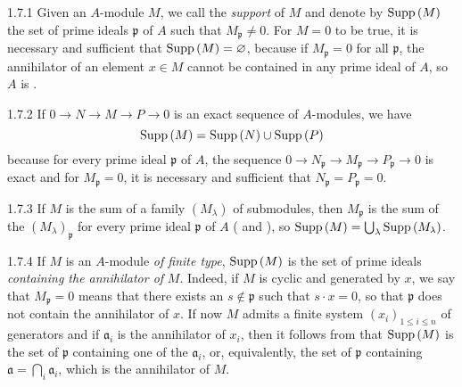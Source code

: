 \begin{env}{1.7.1}
\label{env-0.1.7.1}
Given an $A$-module $M$, we call the \emph{support} of $M$ and denote by
${\mathop{\mathrm{Supp}}\nolimits}\,(M)$ the set of prime ideals $\mathfrak{p}$ of $A$ such that
$M_\mathfrak{p}\neq 0$. For $M=0$ to be true, it is necessary and sufficient
that ${\mathop{\mathrm{Supp}}\nolimits}\,(M)=\varnothing$, because if $M_\mathfrak{p}=0$ for all $\mathfrak{p}$, the
annihilator of an element $x\in M$ cannot be contained in any prime ideal of
$A$, so $A$ is .
\end{env}

\begin{env}{1.7.2}
\label{env-0.1.7.2}
If $0\to N\to M\to P\to 0$ is an exact sequence of $A$-modules, we have
\[
  {\mathop{\mathrm{Supp}}\nolimits}\,(M)={\mathop{\mathrm{Supp}}\nolimits}\,(N)\cup{\mathop{\mathrm{Supp}}\nolimits}\,(P)
\]
because for every prime ideal $\mathfrak{p}$ of $A$, the sequence
$0\to N_\mathfrak{p}\to M_\mathfrak{p}\to P_\mathfrak{p}\to 0$ is exact
 and for $M_\mathfrak{p}=0$, it is necessary and sufficient
that $N_\mathfrak{p}=P_\mathfrak{p}=0$.
\end{env}

\begin{env}{1.7.3}
\label{env-0.1.7.3}
If $M$ is the sum of a family $(M_\lambda)$ of submodules, then $M_\mathfrak{p}$
is the sum of the $(M_\lambda)_\mathfrak{p}$ for every prime ideal
$\mathfrak{p}$ of $A$ ( and ), so
${\mathop{\mathrm{Supp}}\nolimits}\,(M)=\bigcup_\lambda{\mathop{\mathrm{Supp}}\nolimits}\,(M_\lambda)$.
\end{env}

\begin{env}{1.7.4}
\label{env-0.1.7.4}
If $M$ is an $A$-module \emph{of finite type}, ${\mathop{\mathrm{Supp}}\nolimits}\,(M)$ is the set of prime
ideals \emph{containing the annihilator of} $M$. Indeed, if $M$ is cyclic and
generated by $x$, we say that $M_\mathfrak{p}=0$ means that there exists an
$s\not\in\mathfrak{p}$ such that $s\cdot x=0$, so that $\mathfrak{p}$ does not
contain the annihilator of $x$. If now $M$ admits a finite system
$(x_i)_{1\leqslant i\leqslant n}$ of generators and if $\mathfrak{a}_i$ is the
annihilator of $x_i$, then it follows from  that ${\mathop{\mathrm{Supp}}\nolimits}\,(M)$ is
the set of $\mathfrak{p}$ containing one of the $\mathfrak{a}_i$, or,
equivalently, the set of $\mathfrak{p}$ containing
$\mathfrak{a}=\bigcap_i\mathfrak{a}_i$, which is the annihilator of $M$.
\end{env}

